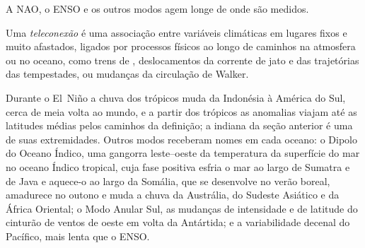 \begin{omfigure}
\centering
\par{}
\end{omfigure}

A NAO, o ENSO e os outros modos agem longe de onde são medidos.

\begin{definition}[Teleconexão]\label{def:b2:climate-variability:teleconnection}
Uma \emph{teleconexão} é uma associação entre variáveis climáticas em
lugares fixos e muito afastados, ligados por processos físicos ao longo de caminhos na atmosfera ou no
oceano, como trens de , deslocamentos da corrente de jato e das trajetórias das tempestades, ou mudanças
da circulação de Walker.
\end{definition}

Durante o El~Niño a chuva dos trópicos muda da Indonésia à América do Sul, cerca de meia
volta ao mundo, e a partir dos trópicos as anomalias viajam até as latitudes médias pelos caminhos
da definição; a  indiana da seção anterior é uma de suas extremidades. Outros modos
receberam nomes em cada oceano: o Dipolo do Oceano Índico, uma gangorra leste--oeste da temperatura da superfície
do mar no oceano Índico tropical, cuja fase positiva esfria o mar ao largo de Sumatra e de Java
e aquece-o ao largo da Somália, que se desenvolve no verão boreal, amadurece no outono e muda
a chuva da Austrália, do Sudeste Asiático e da África Oriental; o Modo Anular Sul, as mudanças de
intensidade e de latitude do cinturão de ventos de oeste em volta da Antártida; e a variabilidade decenal do
Pacífico, mais lenta que o ENSO.

